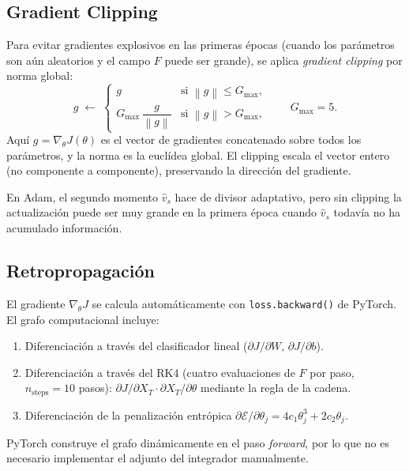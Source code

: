 \documentclass[11pt, a4paper]{article}
\theoremstyle{definition}
\newcommand{\norm}[1]{\left\|#1\right\|}
\begin{document}
\subsection{Gradient Clipping}
\label{sec:clipping}

Para evitar gradientes explosivos en las primeras épocas (cuando los
parámetros son aún aleatorios y el campo $F$ puede ser grande), se aplica
\emph{gradient clipping} por norma global:
\begin{equation}
  g \;\leftarrow\;
  \begin{cases}
    g & \text{si } \norm{g} \leq G_{\max}, \\
    G_{\max}\, \dfrac{g}{\norm{g}} & \text{si } \norm{g} > G_{\max},
  \end{cases}
  \qquad G_{\max} = 5.
\end{equation}
Aquí $g = \nabla_\theta J(\theta)$ es el vector de gradientes concatenado
sobre todos los parámetros, y la norma es la euclídea global. El clipping
escala el vector entero (no componente a componente), preservando la
dirección del gradiente.

En Adam, el segundo momento $\hat{v}_s$ hace de divisor adaptativo, pero sin
clipping la actualización puede ser muy grande en la primera época cuando
$\hat{v}_s$ todavía no ha acumulado información.

\subsection{Retropropagación}
\label{sec:backprop}

El gradiente $\nabla_\theta J$ se calcula automáticamente con
\texttt{loss.backward()} de PyTorch. El grafo computacional incluye:
\begin{enumerate}
  \item Diferenciación a través del clasificador lineal ($\partial J / \partial W$,
        $\partial J / \partial b$).
  \item Diferenciación a través del RK4 (cuatro evaluaciones de $F$ por paso,
        $n_\text{steps} = 10$ pasos): $\partial J / \partial X_T \cdot
        \partial X_T / \partial \theta$ mediante la regla de la cadena.
  \item Diferenciación de la penalización entrópica
        $\partial \mathcal{E} / \partial \theta_j = 4c_1 \theta_j^3 + 2c_2 \theta_j$.
\end{enumerate}
PyTorch construye el grafo dinámicamente en el paso \emph{forward}, por lo que
no es necesario implementar el adjunto del integrador manualmente.
\end{document}
